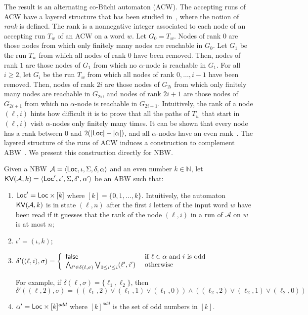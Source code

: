\documentclass{LMCS}
\def\abs#1{\ensuremath{\lvert #1\rvert}}
\newcommand{\nat}{\mathbb N}
\renewcommand{\l}{{\ell}}
\newcommand{\Loc}{{\sf Loc}}
\newcommand{\tuple}[1]{\langle #1 \rangle}
\newcommand{\A}{\mathcal{A}}
\newcommand{\false}{{\sf false}}
\newcommand{\KV}{{\sf KV}}
\begin{document}
The result is an alternating co-B\"uchi automaton (ACW). The accepting runs of
ACW have a layered structure that has been studied
in~\cite{kupferman97weak}, where the notion of \emph{rank} is
defined.  The rank is a nonnegative integer associated to each node of an accepting
run $T_w$ of an ACW on a word $w$.  Let $G_0 = T_w$. Nodes of rank $0$
are those nodes from which only finitely many nodes are reachable in
$G_0$. Let $G_1$ be the run $T_w$ from which all nodes of rank $0$
have been removed. Then, nodes of rank $1$ are those nodes of $G_1$
from which no $\alpha$-node is reachable in $G_1$. For all $i\geq 2$, let
$G_{i}$ be the run $T_w$ from which all nodes of rank
$0,\dots,i-1$ have been removed. Then, nodes of rank $2i$ are those
nodes of $G_{2i}$ from which only finitely many nodes are reachable in
$G_{2i}$, and nodes of rank $2i+1$ are those nodes of $G_{2i+1}$ from
which no $\alpha$-node is reachable in $G_{2i+1}$. Intuitively, the
rank of a node $(\l,i)$ hints how difficult it is to prove that all
the paths of $T_w$ that start in $(\l,i)$ visit $\alpha$-nodes only
finitely many times. It can be shown that every node has a rank
between $0$ and $2(\abs{\Loc} - \abs{\alpha})$, and all $\alpha$-nodes
have an even rank~\cite{GurumurthyKSV03}. The layered structure of the 
runs of ACW induces a construction to complement ABW~\cite{kupferman97weak}. 
We present this construction directly for NBW. 

\begin{defi}\label{def:KV-construction}
Given a NBW $\A = \tuple{\Loc, \iota, \Sigma, \delta,
  \alpha}$ and an even number $k \in \nat$, let $\KV(\A,k) = \tuple{\Loc',
  \iota', \Sigma, \delta', \alpha'}$ be an ABW such that:

\begin{enumerate}[$\bullet$]
\item $\Loc' = \Loc \times [k]$ where $[k] = \{0,1,\dots,k\}$.
  Intuitively, the automaton $\KV(\A,k)$ is in state $(\l,n)$
  after the first $i$ letters of the input word $w$ have been read if
  it guesses that the rank of the node $(\l,i)$ in a run of $\A$ on
  $w$ is at most $n$;
\item $\iota'  = (\iota, k)$;
\item $\delta'((\l,i),\sigma) = \left\{\begin{array}{ll} \false  & \text{ if } \l\in\alpha \text{ and } i \text{ is odd} \\ 
						\bigwedge_{\l' \in \delta(\l,\sigma)} \bigvee_{0 \leq i'\leq i} (\l',i') & \text{ otherwise }
				\end{array}\right.$ 

\medskip
\noindent For example, if $\delta(\l,\sigma) = \{\l_1, \l_2\}$, then 
$$\delta'((\l,2),\sigma) = ((\l_1,2) \lor (\l_1,1) \lor (\l_1,0)) \land ((\l_2,2) \lor (\l_2,1) \lor (\l_2,0))$$
\item $\alpha' = \Loc \times [k]^{odd}$ where $[k]^{odd}$ is the set of odd numbers in $[k]$.
\end{enumerate}
\end{defi}
\end{document}
